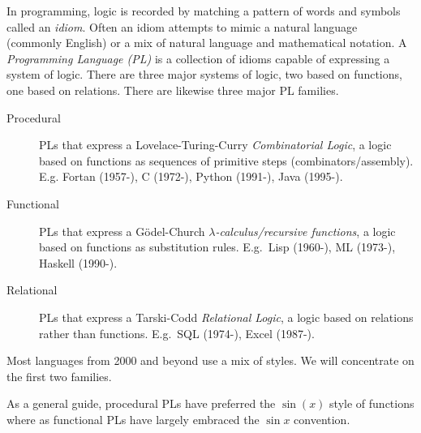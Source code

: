 \begin{remark}
    In programming, logic is recorded by matching 
    a pattern of words and symbols called an \emph{idiom}.
    Often an idiom attempts to mimic a natural language
    (commonly English) or a mix of natural language and 
    mathematical notation.  A \emph{Programming Language (PL)}
    is a collection of idioms capable of expressing a 
    system of logic.  There are three major
    systems of logic, two based on functions, one based on 
    relations.  There are likewise three major PL families.
    \begin{description}
        \item[Procedural] PLs that express a 
        Lovelace-Turing-Curry \emph{Combinatorial Logic}, a logic 
        based on functions as sequences of primitive steps
        (combinators/assembly).  E.g. Fortan (1957-), C (1972-), 
        Python (1991-), Java (1995-).
    
        \item[Functional] PLs that express a 
        G\"odel-Church \emph{$\lambda$-calculus/recursive functions}, a logic 
        based on functions as substitution rules.
        E.g.\ Lisp (1960-), ML (1973-), Haskell (1990-). 
        
        \item[Relational] PLs that express a 
        Tarski-Codd \emph{Relational Logic}, a logic 
        based on relations rather than functions.
        E.g.\ SQL (1974-), Excel (1987-).
        
    \end{description}
    Most languages from 2000 and beyond use a mix of styles.
    We will concentrate on the first two families.    

    As a general guide, procedural PLs have preferred the 
    $\sin(x)$ style of functions where as functional PLs have 
    largely embraced the $\sin x$ convention.
\end{remark}

